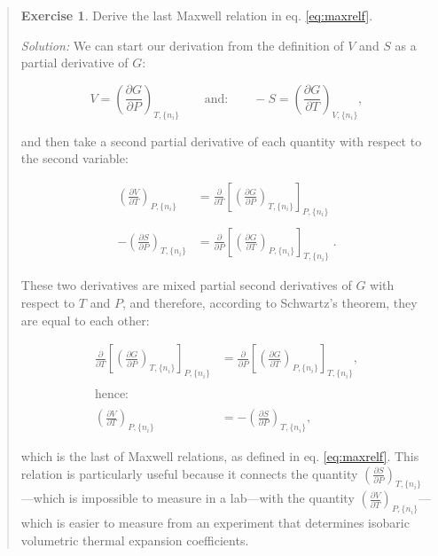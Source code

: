 \documentclass[
]{book}
\theoremstyle{definition}
\theoremstyle{definition}
\theoremstyle{definition}
\newtheorem{exercise}{Exercise}[chapter]
\theoremstyle{remark}
\begin{document}
\begin{quote}
\begin{exercise}
\protect\hypertarget{exr:maxwellEx}{}{\label{exr:maxwellEx} }Derive the last Maxwell relation in eq. \eqref{eq:maxrelf}.

\emph{Solution:} We can start our derivation from the definition of \(V\) and \(S\) as a partial derivative of \(G\):

\begin{equation}
 V = \left(\frac{\partial G}{\partial P} \right)_{T,\{n_i\}} \qquad \text{and:} \qquad -S = \left(\frac{\partial G}{\partial T} \right)_{V,\{n_i\}},
\end{equation}

and then take a second partial derivative of each quantity with respect to the second variable:

\begin{equation}
\begin{aligned}
 \left(\frac{\partial V}{\partial T} \right)_{P,\{n_i\}} &=\frac{\partial}{\partial T}\left[ \left(\frac{\partial G}{\partial P} \right)_{T,\{n_i\}} \right]_{P,\{n_i\}} \\
\\
-\left(\frac{\partial S}{\partial P} \right)_{T,\{n_i\}} &=\frac{\partial}{\partial P}\left[ \left(\frac{\partial G}{\partial T} \right)_{P,\{n_i\}} \right]_{T,\{n_i\}} \;.
\end{aligned}
\end{equation}

These two derivatives are mixed partial second derivatives of \(G\) with respect to \(T\) and \(P\), and therefore, according to Schwartz's theorem, they are equal to each other:

\begin{equation}
\begin{aligned}
\frac{\partial}{\partial T}\left[ \left(\frac{\partial G}{\partial P} \right)_{T,\{n_i\}} \right]_{P,\{n_i\}} &=
\frac{\partial}{\partial P}\left[ \left(\frac{\partial G}{\partial T} \right)_{P,\{n_i\}} \right]_{T,\{n_i\}}, \\
\\
\text{hence:} \\
\\
 \left(\frac{\partial V}{\partial T} \right)_{P,\{n_i\}} &= -\left(\frac{\partial S}{\partial P} \right)_{T,\{n_i\}},
\end{aligned}
\end{equation}

which is the last of Maxwell relations, as defined in eq. \eqref{eq:maxrelf}. This relation is particularly useful because it connects the quantity \(\left(\frac{\partial S}{\partial P} \right)_{T,\{n_i\}}\)---which is impossible to measure in a lab---with the quantity \(\left(\frac{\partial V}{\partial T} \right)_{P,\{n_i\}}\)---which is easier to measure from an experiment that determines isobaric volumetric thermal expansion coefficients.
\end{exercise}
\end{quote}
\end{document}
